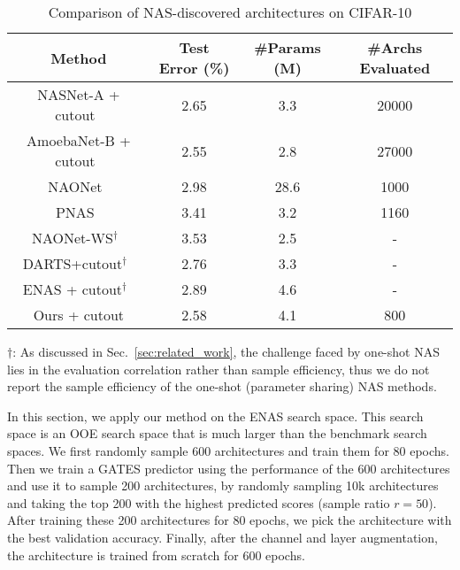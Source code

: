 \documentclass[runningheads]{llncs}
\begin{document}
\addtolength{\tabcolsep}{1pt}
\begin{table}[tb]
  \caption{Comparison of NAS-discovered architectures on CIFAR-10}
  \label{table:nas-enas}
  \begin{center}
    \begin{tabular}{cccc}
      \toprule
      Method & Test Error (\%) & \#Params (M) & \#Archs Evaluated\\\midrule
      NASNet-A + cutout~\cite{zoph2016neural}         & 2.65 & 3.3   & 20000 \\
      AmoebaNet-B + cutout~\cite{real2019regularized} & 2.55 & 2.8   & 27000 \\
      NAONet~\cite{nao2018}                           & 2.98 & 28.6  & 1000  \\
      PNAS~\cite{liu2018progressive}                  & 3.41 & 3.2   & 1160  \\\cmidrule(lr){1-4}
      NAONet-WS$^\dagger$~\cite{nao2018}                        & 3.53 & 2.5   & -     \\
      DARTS+cutout$^\dagger$~\cite{darts}                       & 2.76 & 3.3   & -     \\
      ENAS + cutout$^\dagger$~\cite{pham2018efficient}          & 2.89 & 4.6   & -     \\ \hline
      Ours + cutout                                   & 2.58 & 4.1  & 800   \\ \bottomrule
    \end{tabular}
      \begin{minipage}{1.0\textwidth}
$\dagger$: As discussed in Sec.~\ref{sec:related_work}, the challenge faced by one-shot NAS lies in the evaluation correlation rather than sample efficiency, thus we do not report the sample efficiency of the one-shot (parameter sharing) NAS methods.
\end{minipage}
  \end{center}
\end{table}
\addtolength{\tabcolsep}{-1pt}

In this section, we apply our method on the ENAS search space. This search space is an OOE search space that is much larger than the benchmark search spaces. We first randomly sample 600 architectures and train them for 80 epochs.
Then we train a GATES predictor using the performance of the 600 architectures and use it
to sample 200 architectures, by randomly sampling 10k architectures and taking the top 200
with the highest predicted scores (sample ratio $r=50$). After training these 200 architectures for 80 epochs, we pick the architecture with the best validation accuracy. Finally, after the channel and layer augmentation, the architecture is trained from scratch for 600 epochs.
\end{document}
